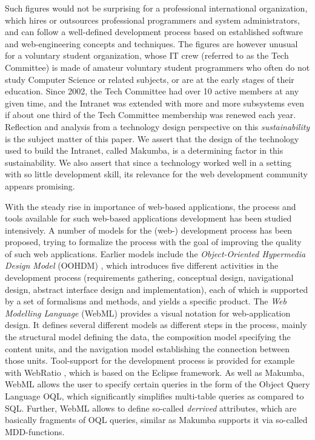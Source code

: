 \documentclass{llncs}
\begin{document}
Such figures would not be surprising for a professional international organization, which hires or outsources professional programmers and system administrators, and can follow a well-defined development process based on established software and web-engineering concepts and techniques.
The figures are however unusual for a voluntary student organization, whose IT crew (referred to as the Tech Committee) is made of amateur voluntary student programmers who often do not study Computer Science or related subjects, or are at the early stages of their education. 
Since 2002, the Tech Committee had over 10 active members at any given time, and the Intranet was extended with more and more subsystems even if about one third of the Tech Committee membership was renewed each year. Reflection and analysis from a technology design perspective on this {\it sustainability}  is the subject matter of this paper. We assert that the design of the technology used to build the Intranet, called Makumba, is a determining factor in this sustainability. We also assert that since a technology worked well in a setting with so little development skill, its relevance for the web development community appears promising.

With the steady rise in importance of web-based applications, the process and tools available for such web-based applications development has been studied intensively. A number of models for the (web-) development process has been proposed, trying to formalize the process with the goal of improving the quality of such web applications. Earlier models include the \textit{Object-Oriented Hypermedia Design Model} (OOHDM) \cite{schwabe1998ooa}, which introduces five different activities in the development process (requirements gathering, conceptual design, navigational design, abstract interface design and implementation), each of which is supported by a set of formalisms and methods, and yields a specific product. The \textit{Web Modelling Language} (WebML) \cite{Ceri00webmodeling} provides a visual notation for web-application design. It defines several different models as different steps in the process, mainly the structural model defining the data, the composition model specifying the content units, and the navigation model establishing the connection between those units. Tool-support for the development process is provided for example with WebRatio \cite{acerbis2004wit}, which is based on the Eclipse framework. As well as Makumba, WebML allows the user to specify certain queries in the form of the Object Query Language OQL, which significantly simplifies multi-table queries as compared to SQL. Further, WebML allows to define so-called \textit{derrived} attributes, which are basically fragments of OQL queries, similar as Makumba supports it via so-called MDD-functions.
\end{document}
